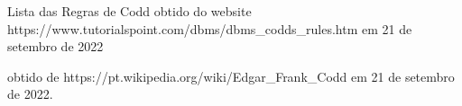 \documentclass[
12pt,		%
openright,	%
twoside,  %
a4paper,			%
chapter=TITLE,		%
english,			%
french,				%
spanish,			%
brazil				%
]{USPSC-classe/USPSC_RedarTex}
\begin{document}
\begin{flushleft}
\begin{flushleft}
\begin{flushleft}
\begin{flushleft}
\begin{flushleft}
\begin{flushleft}
\begin{flushleft}
\begin{flushleft}
\begin{flushleft}
\begin{flushleft}
[TutorialsPoint, 2022] Lista das Regras de Codd obtido do website https://www.tutorialspoint.com/dbms/dbms\_codds\_rules.htm em 21 de setembro de 2022
\end{flushleft}


\end{flushleft}


\end{flushleft}


\end{flushleft}


\end{flushleft}


\end{flushleft}


\end{flushleft}


\end{flushleft}


\end{flushleft}


\end{flushleft}


\begin{flushleft}
\begin{flushleft}
\begin{flushleft}
\begin{flushleft}
\begin{flushleft}
\begin{flushleft}
\begin{flushleft}
\begin{flushleft}
\begin{flushleft}
\begin{flushleft}
 obtido de https://pt.wikipedia.org/wiki/Edgar\_Frank\_Codd em 21 de setembro de 2022.
\end{flushleft}


\end{flushleft}


\end{flushleft}


\end{flushleft}


\end{flushleft}


\end{flushleft}


\end{flushleft}


\end{flushleft}


\end{flushleft}


\end{flushleft}
\end{document}
